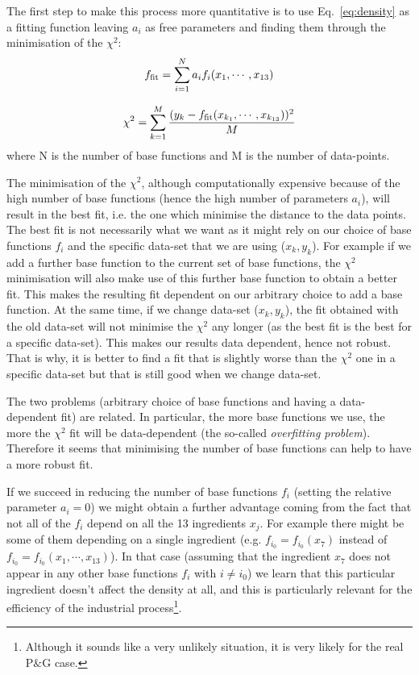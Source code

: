 \documentclass[11pt]{article}
\newcommand{\peg}{P$\&$G }
\begin{document}
The first step to make this process more quantitative is to use Eq.~\ref{eq:density} as a fitting function leaving $a_i$ as free parameters and finding them through the minimisation of the $\chi^2$:
\begin{equation}
\label{eq:density}
f_{\rm{fit}} = \sum_{i=1}^N a_i f_i(x_1, \cdots, x_{13})
\end{equation}

\begin{equation}
\label{eq:chisquared}
\chi^2=\sum_{k=1}^M\frac{(y_k - f_{\rm{fit}}(x_{k_1},\cdots,x_{k_{13}}))^2}{M}
\end{equation}
where N is the number of base functions and M is the number of data-points.

The minimisation of the $\chi^2$, although computationally expensive because of the high number of base functions (hence the high number of parameters $a_i$), will result in the best fit, i.e. the one which minimise the distance to the data points. The best fit is not necessarily what we want as it might rely on our choice of base functions $f_i$ and the specific data-set that we are using ($x_k,y_k$). 
For example if we add a further base function to the current set of base functions, the $\chi^2$ minimisation will also make use of this further base function to obtain a better fit. This makes the resulting fit dependent on our arbitrary choice to add a base function. 
At the same time, if we change data-set ($x_k,y_k$), the fit obtained with the old data-set will not minimise the $\chi^2$ any longer (as the best fit is the best for a specific data-set). This makes our results data dependent, hence not robust. 
That is why, it is better to find a fit that is slightly worse than the $\chi^2$ one in a specific data-set but that is still good when we change data-set.

The two problems (arbitrary choice of base functions and having a data-dependent fit) are related. In particular, the more base functions we use, the more the $\chi^2$ fit will be data-dependent (the so-called \textit{overfitting problem}). Therefore it seems that minimising the number of base functions can help to have a more robust fit.

If we succeed in reducing the number of base functions $f_i$ (setting the relative parameter $a_i=0$) we might obtain a further advantage coming from the fact that not all of the $f_i$ depend on all the 13 ingredients $x_j$. For example there might be some of them depending on a single ingredient (e.g. $f_{i_0} = f_{i_0}(x_7)$ instead of $f_{i_0} = f_{i_0}(x_1,\cdots,x_{13})$). In that case (assuming that the ingredient $x_7$ does not appear in any other base functions $f_i$ with $i\neq i_0$) we learn that this particular ingredient doesn't affect the density at all, and this is particularly relevant for the efficiency of the industrial process\footnote{Although it sounds like a very unlikely situation, it is very likely for the real \peg case.}. \\
\end{document}
